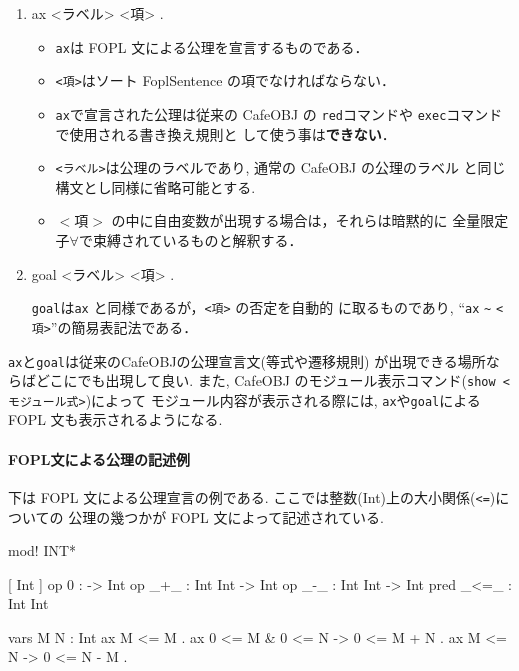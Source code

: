 \begin{enumerate}
\item 
  \begin{vvtm}
    \begin{simplev}
ax <ラベル> <項> .
    \end{simplev}
  \end{vvtm}

  \begin{itemize}
    \item \texttt{ax}は FOPL 文による公理を宣言するものである．
    \item \texttt{<項>}はソート FoplSentence の項でなければならない．
    \item \texttt{ax}で宣言された公理は従来の CafeOBJ の
      \texttt{red}コマンドや \texttt{exec}コマンドで使用される書き換え規則と
      して使う事は\textbf{できない}．
    \item \texttt{<ラベル>}は公理のラベルであり, 通常の CafeOBJ の公理のラベル
      と同じ構文とし同様に省略可能とする.
      \item $<$項$>$ の中に自由変数が出現する場合は，それらは暗黙的に
        全量限定子$\forall$で束縛されているものと解釈する．
      \end{itemize}
\item 
\begin{vvtm}
\begin{simplev}
goal <ラベル> <項> .
\end{simplev}
\end{vvtm}

\texttt{goal}は\texttt{ax} と同様であるが，\texttt{<項>} の否定を自動的
    に取るものであり, ``\texttt{ax} \verb|~| \texttt{<項>}''の簡易表記法である．

\end{enumerate}
\texttt{ax}と\texttt{goal}は従来のCafeOBJの公理宣言文(等式や遷移規則)
が出現できる場所ならばどこにでも出現して良い. 
また, CafeOBJ のモジュール表示コマンド(\texttt{show <モジュール式>})によって 
モジュール内容が表示される際には, \texttt{ax}や\texttt{goal}による FOPL
文も表示されるようになる. 

\paragraph{FOPL文による公理の記述例}
下は FOPL 文による公理宣言の例である.
ここでは整数(Int)上の大小関係(\texttt{<=})についての
公理の幾つかが FOPL 文によって記述されている.
\begin{vvtm}
\begin{simplev}
    mod! INT* {
      [ Int ]
      op 0 : -> Int
      op _+_ : Int Int -> Int
      op _-_ : Int Int -> Int
      pred _<=_ : Int Int

      vars M N : Int
      ax M <= M .
      ax 0 <= M & 0 <= N -> 0 <= M + N .
      ax M <= N -> 0 <= N - M .
    }
\end{simplev}
\end{vvtm}

